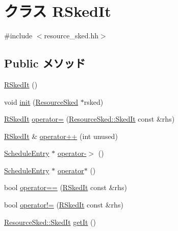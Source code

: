 \hypertarget{classRSkedIt}{
\section{クラス RSkedIt}
\label{classRSkedIt}
}


{\ttfamily \#include $<$resource\_\-sked.hh$>$}\subsection*{Public メソッド}
\begin{DoxyCompactItemize}
\item 
\hyperlink{classRSkedIt_acf362f222df60312b3c012b2d924e978}{RSkedIt} ()
\item 
void \hyperlink{classRSkedIt_a4e0fbb4d6ed0a1241dd558720a96eaf7}{init} (\hyperlink{classResourceSked}{ResourceSked} $\ast$rsked)
\item 
\hyperlink{classRSkedIt}{RSkedIt} \hyperlink{classRSkedIt_aa89a0d19c98c20f4266d96974669be94}{operator=} (\hyperlink{classResourceSked_ab2a9eec675af76477619cacd99ea5225}{ResourceSked::SkedIt} const \&rhs)
\item 
\hyperlink{classRSkedIt}{RSkedIt} \& \hyperlink{classRSkedIt_a0d42c19d83a71f46da297ca5adac3843}{operator++} (int unused)
\item 
\hyperlink{classScheduleEntry}{ScheduleEntry} $\ast$ \hyperlink{classRSkedIt_a5733575f5f726d6b9be5964d6c68bae8}{operator-\/$>$} ()
\item 
\hyperlink{classScheduleEntry}{ScheduleEntry} $\ast$ \hyperlink{classRSkedIt_af56c8e60fe7ffa5747cbcbfcc21bbef5}{operator$\ast$} ()
\item 
bool \hyperlink{classRSkedIt_ae14e85b1dd1edd4d43e02e1752a53128}{operator==} (\hyperlink{classRSkedIt}{RSkedIt} const \&rhs)
\item 
bool \hyperlink{classRSkedIt_af7fa11f330025f24da68814f87079e54}{operator!=} (\hyperlink{classRSkedIt}{RSkedIt} const \&rhs)
\item 
\hyperlink{classResourceSked_ab2a9eec675af76477619cacd99ea5225}{ResourceSked::SkedIt} \hyperlink{classRSkedIt_a439650ab563a74697e9646155f2cb104}{getIt} ()
\end{DoxyCompactItemize}
